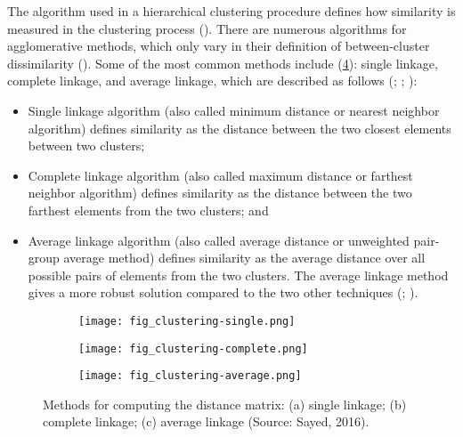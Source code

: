 The algorithm used in a hierarchical clustering procedure defines how similarity is measured in the clustering process (\cite{hair_multivariate_2013}). There are numerous algorithms for agglomerative methods, which only vary in their definition of between-cluster dissimilarity (\cite{kaufman_introduction_1990}). Some of the most common methods include (\ref{fig: litrev-fig2.3}): single linkage, complete linkage, and average linkage, which are described as follows (\cite{podani_introduction_2000}; \cite{bajorski_statistics_2011}; \cite{hair_multivariate_2013}):

\begin{itemize}
	\item Single linkage algorithm (also called minimum distance or nearest neighbor algorithm) defines similarity as the distance between the two closest elements between two clusters;
	\item Complete linkage algorithm (also called maximum distance or farthest neighbor algorithm) defines similarity as the distance between the two farthest elements from the two clusters; and
	\item Average linkage algorithm (also called average distance or unweighted pair-group average method) defines similarity as the average distance over all possible pairs of elements from the two clusters. The average linkage method gives a more robust solution compared to the two other techniques (\cite{sokal_principles_1963}; \cite{johnson_hierarchical_1967}).
\end{itemize}

\begin{figure}[!ht] \centering
	\captionsetup[subfigure]{width=2.0in} %
	\begin{subfigure}[t]{0.32\textwidth}
		\texttt{[image: fig\_clustering-single.png]}
		\caption[Linkage methods in clustering.]{}
		\label{fig: litrev-fig2.3a}
	\end{subfigure}
	\begin{subfigure}[t]{0.32\textwidth}
		\texttt{[image: fig\_clustering-complete.png]}
		\caption[Linkage methods in clustering.]{}
		\label{fig: litrev-fig2.3b}
	\end{subfigure}
	\begin{subfigure}[t]{0.32\textwidth}
		\texttt{[image: fig\_clustering-average.png]}
		\caption[Linkage methods in clustering.]{}
		\label{fig: litrev-fig2.3c}
	\end{subfigure}
	\caption[Methods for computing the distance matrix: (a) single linkage; (b) complete linkage; (c) average linkage.]{Methods for computing the distance matrix: (a) single linkage; (b) complete linkage; (c) average linkage (Source: Sayed, 2016).}
	\label{fig: litrev-fig2.3}
\end{figure}

